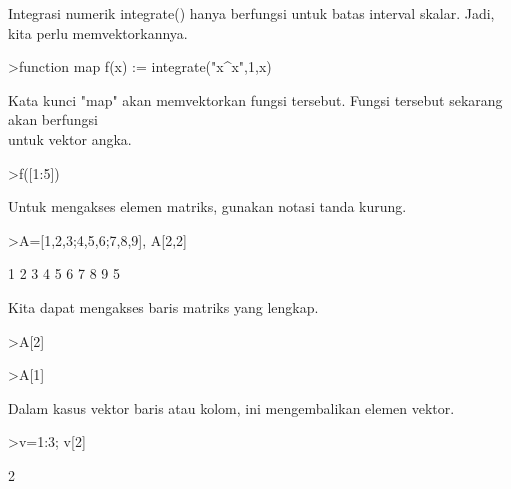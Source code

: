 \documentclass[a4paper,10pt]{article}
\begin{document}
\begin{eulernotebook}
\begin{eulercomment}
\begin{eulercomment}
\begin{eulercomment}
\begin{eulercomment}
\begin{eulercomment}
\begin{eulercomment}
\begin{eulercomment}
Integrasi numerik integrate() hanya berfungsi untuk batas interval
skalar. Jadi, kita perlu memvektorkannya.
\end{eulercomment}
\begin{eulerprompt}
>function map f(x) := integrate("x^x",1,x)
\end{eulerprompt}
\begin{eulercomment}
Kata kunci "map" akan memvektorkan fungsi tersebut. Fungsi tersebut
sekarang akan berfungsi\\
untuk vektor angka.
\end{eulercomment}
\begin{eulerprompt}
>f([1:5])
\end{eulerprompt}
\begin{euleroutput}
  [0,  2.05045,  13.7251,  113.336,  1241.03]
\end{euleroutput}
\begin{eulercomment}
Untuk mengakses elemen matriks, gunakan notasi tanda kurung.
\end{eulercomment}
\begin{eulerprompt}
>A=[1,2,3;4,5,6;7,8,9], A[2,2]
\end{eulerprompt}
\begin{euleroutput}
              1             2             3 
              4             5             6 
              7             8             9 
  5
\end{euleroutput}
\begin{eulercomment}
Kita dapat mengakses baris matriks yang lengkap.
\end{eulercomment}
\begin{eulerprompt}
>A[2]
\end{eulerprompt}
\begin{euleroutput}
  [5,  6,  7,  8]
\end{euleroutput}
\begin{eulerprompt}
>A[1]
\end{eulerprompt}
\begin{euleroutput}
  [1,  2,  3,  4]
\end{euleroutput}
\begin{eulercomment}
Dalam kasus vektor baris atau kolom, ini mengembalikan elemen vektor.
\end{eulercomment}
\begin{eulerprompt}
>v=1:3; v[2]
\end{eulerprompt}
\begin{euleroutput}
  2

\end{euleroutput}
\end{eulercomment}
\end{eulercomment}
\end{eulercomment}
\end{eulercomment}
\end{eulercomment}
\end{eulercomment}
\end{eulernotebook}
\end{document}
